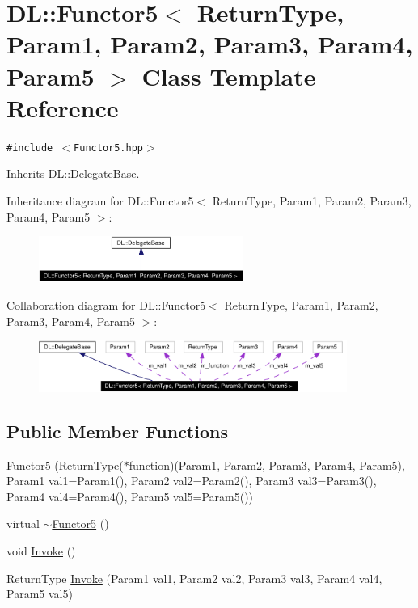 \hypertarget{classDL_1_1Functor5}{
\section{DL::Functor5$<$ Return\-Type, Param1, Param2, Param3, Param4, Param5 $>$ Class Template Reference}
\label{classDL_1_1Functor5}
}
{\tt \#include $<$Functor5.hpp$>$}

Inherits \hyperlink{classDL_1_1DelegateBase}{DL::Delegate\-Base}.

Inheritance diagram for DL::Functor5$<$ Return\-Type, Param1, Param2, Param3, Param4, Param5 $>$:\begin{figure}[H]
\begin{center}
\leavevmode
\includegraphics[width=190pt]{classDL_1_1Functor5__inherit__graph}
\end{center}
\end{figure}
Collaboration diagram for DL::Functor5$<$ Return\-Type, Param1, Param2, Param3, Param4, Param5 $>$:\begin{figure}[H]
\begin{center}
\leavevmode
\includegraphics[width=286pt]{classDL_1_1Functor5__coll__graph}
\end{center}
\end{figure}
\subsection*{Public Member Functions}
\begin{CompactItemize}
\item 
\hyperlink{classDL_1_1Functor5_a0}{Functor5} (Return\-Type($\ast$function)(Param1, Param2, Param3, Param4, Param5), Param1 val1=Param1(), Param2 val2=Param2(), Param3 val3=Param3(), Param4 val4=Param4(), Param5 val5=Param5())
\item 
virtual \hyperlink{classDL_1_1Functor5_a1}{$\sim$Functor5} ()
\item 
void \hyperlink{classDL_1_1Functor5_a2}{Invoke} ()
\item 
Return\-Type \hyperlink{classDL_1_1Functor5_a3}{Invoke} (Param1 val1, Param2 val2, Param3 val3, Param4 val4, Param5 val5)
\end{CompactItemize}
